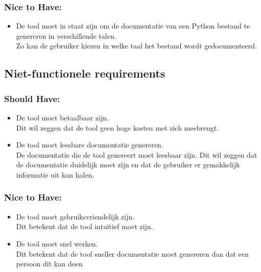 \subsubsection{Nice to Have:}
\begin{itemize}
    \item De tool moet in staat zijn om de documentatie van een Python bestand te genereren in verschillende talen.\\
    Zo kan de gebruiker kiezen in welke taal het bestand wordt gedocumenteerd.
\end{itemize}

\subsection{Niet-functionele requirements}
\label{sec:niet-functionele-requirements}
\subsubsection{Should Have:}
\begin{itemize}
    \item De tool moet betaalbaar zijn.\\
    Dit wil zeggen dat de tool geen hoge kosten met zich meebrengt.
    \item De tool moet leesbare documentatie genereren.\\
    De documentatie die de tool genereert moet leesbaar zijn. Dit wil zeggen dat de documentatie duidelijk moet zijn en dat de gebruiker er gemakkelijk informatie uit kan halen.    
\end{itemize}

\subsubsection{Nice to Have:}
\begin{itemize}
    \item De tool moet gebruiksvriendelijk zijn.\\
    Dit betekent dat de tool intuïtief moet zijn.
    \item De tool moet snel werken.\\
    Dit betekent dat de tool sneller documentatie moet genereren dan dat een persoon dit kan doen
\end{itemize}

